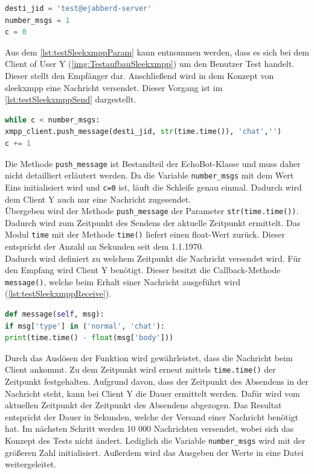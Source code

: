 \documentclass[a4paper,titlepage,halfparskip,12pt]{scrreprt}
\begin{document}
\begin{onehalfspacing}
\begin{lstlisting}[language=python, caption={Parameter für den Test}, label={lst:testSleekxmppParam}]
desti_jid = 'test@ejabberd-server'
number_msgs = 1
c = 0
\end{lstlisting}
Aus dem \autoref{lst:testSleekxmppParam} kann entnommen werden, dass es sich bei dem Client of User Y (\autoref{img:TestaufbauSleekxmpp}) um den Benutzer Test handelt. Dieser stellt den Empfänger dar. Anschließend wird in dem Konzept von sleekxmpp eine Nachricht versendet. Dieser Vorgang ist im \autoref{lst:testSleekxmppSend} dargestellt.
\begin{lstlisting}[language=python, caption={Sendevorgang der Testnachricht}, label={lst:testSleekxmppSend}]
while c < number_msgs:
xmpp_client.push_message(desti_jid, str(time.time()), 'chat','')
c += 1
\end{lstlisting}
Die Methode \texttt{push\_message} ist Bestandteil der EchoBot-Klasse und muss daher nicht detailliert erläutert werden. Da die Variable \texttt{number\_msgs} mit dem Wert Eins initialisiert wird und \texttt{c=0} ist, läuft die Schleife genau einmal. Dadurch wird dem Client Y auch nur eine Nachricht zugesendet.\\
Übergeben wird der Methode \texttt{push\_message} der Parameter \texttt{str(time.time())}. Dadurch wird zum Zeitpunkt des Sendens der aktuelle Zeitpunkt ermittelt. Das Modul \texttt{time} mit der Methode \texttt{time()} liefert einen float-Wert zurück. Dieser entspricht der Anzahl an Sekunden seit dem 1.1.1970. \cite{pythonDocsTime}\\
Dadurch wird definiert zu welchem Zeitpunkt die Nachricht versendet wird. Für den Empfang wird Client Y benötigt. Dieser besitzt die Callback-Methode \texttt{message()}, welche beim Erhalt einer Nachricht ausgeführt wird (\autoref{lst:testSleekxmppReceive}).
\begin{lstlisting}[language=python, caption={Empfangvorgang der Testnachricht}, label={lst:testSleekxmppReceive}]
def message(self, msg):
if msg['type'] in ('normal', 'chat'):
print(time.time() - float(msg['body']))
\end{lstlisting}
Durch das Auslösen der Funktion wird gewährleistet, dass die Nachricht beim Client ankommt. Zu dem Zeitpunkt wird erneut mittels \texttt{time.time()} der Zeitpunkt festgehalten. Aufgrund davon, dass der Zeitpunkt des Absendens in der Nachricht steht, kann bei Client Y die Dauer ermittelt werden. Dafür wird vom aktuellen Zeitpunkt der Zeitpunkt des Absendens abgezogen. Das Resultat entspricht der Dauer in Sekunden, welche der Versand einer Nachricht benötigt hat. Im nächsten Schritt werden 10 000 Nachrichten versendet, wobei sich das Konzept des Tests nicht ändert. Lediglich die Variable \texttt{number\_msgs} wird mit der größeren Zahl initialisiert. Außerdem wird das Ausgeben der Werte in eine Datei weitergeleitet.


\end{onehalfspacing}
\end{document}
